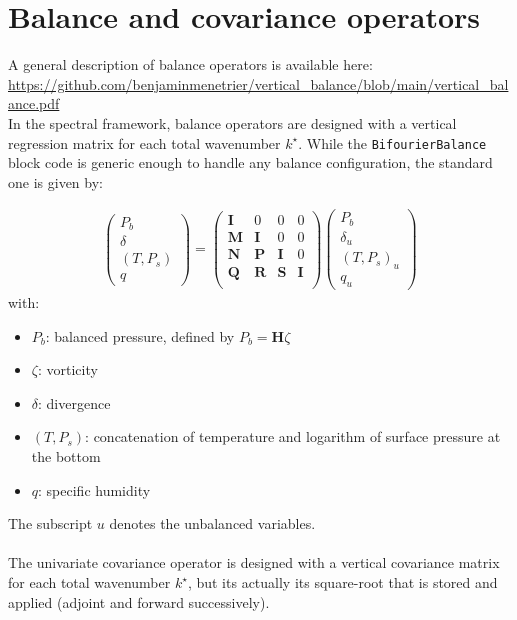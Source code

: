 \documentclass[12pt]{scrartcl}
\begin{document}
\section{Balance and covariance operators}

A general description of balance operators is available here: \url{https://github.com/benjaminmenetrier/vertical_balance/blob/main/vertical_balance.pdf}\\

In the spectral framework, balance operators are designed with a vertical regression matrix for each total wavenumber $k^\star$. While the \texttt{BifourierBalance} block code is generic enough to handle any balance configuration, the standard one \cite{berre_2000} is given by:

\begin{align}
\left( \begin{array}{c}
P_b \\
\delta \\
(T, P_s) \\
q
\end{array} \right) = \left( \begin{array}{cccc}
\mathbf{I} & 0 & 0 & 0 \\
\mathbf{M} & \mathbf{I} & 0 & 0 \\
\mathbf{N} & \mathbf{P} & \mathbf{I} & 0 \\
\mathbf{Q} & \mathbf{R} & \mathbf{S} & \mathbf{I} \\
\end{array} \right)
\left( \begin{array}{c}
P_b \\
\delta_u \\
(T, P_s)_u \\
q_u
\end{array} \right)
\end{align}
with:
\begin{itemize}
\item $P_b$: balanced pressure, defined by $P_b = \mathbf{H} \zeta$
\item $\zeta$: vorticity
\item $\delta$: divergence
\item $(T,P_s)$: concatenation of temperature and logarithm of surface pressure at the bottom
\item $q$: specific humidity
\end{itemize}
The subscript $u$ denotes the unbalanced variables.\\
$  $\\
The univariate covariance operator is designed with a vertical covariance matrix for each total wavenumber $k^\star$, but its actually its square-root that is stored and applied (adjoint and forward successively).



\end{document}
